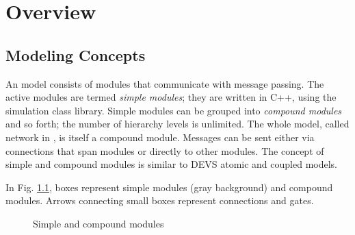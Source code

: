\chapter{Overview}
\label{cha:overview}


\section{Modeling Concepts}
\label{sec:overview:modeling-concepts}

An {\opp} model consists of modules that communicate with message passing.
The active modules are termed \textit{simple modules}; they are written in C++,
using the simulation class library. Simple modules can be grouped into
\textit{compound modules} and so forth; the number of hierarchy levels is
unlimited. The whole model, called network in {\opp}, is itself a compound module.
Messages can be sent either via connections that span
modules or directly to other modules. The concept of simple and
compound modules is similar to DEVS atomic and coupled models.

In Fig. \ref{fig:ch-overview:modules}, boxes represent simple modules
(gray background) and compound modules.
Arrows connecting small boxes represent connections and gates.

\begin{figure}[htbp]
  \begin{center}
    
    \caption{Simple and compound modules}
    \label{fig:ch-overview:modules}
  \end{center}
\end{figure}


